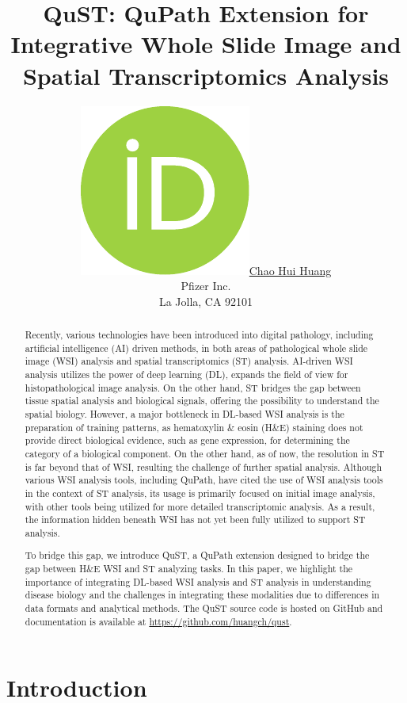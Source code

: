 \documentclass{article}
\title{QuST: QuPath Extension for Integrative Whole Slide Image and Spatial Transcriptomics Analysis}
\author{ \href{https://orcid.org/0000-0002-3837-8135}{\includegraphics[scale=0.06]{orcid.pdf}\hspace{1mm}Chao Hui Huang}\\
	Pfizer Inc.\\
	La Jolla, CA 92101 \\
}
\begin{document}
\maketitle

\begin{abstract}

Recently, various technologies have been introduced into digital pathology, including artificial intelligence (AI) driven methods, in both areas of pathological whole slide image (WSI) analysis and spatial transcriptomics (ST) analysis. AI-driven WSI analysis utilizes the power of deep learning (DL), expands the field of view for histopathological image analysis.  On the other hand, ST bridges the gap between tissue spatial analysis and biological signals, offering the possibility to understand the spatial biology. However, a major bottleneck in DL-based WSI analysis is the preparation of training patterns, as hematoxylin \& eosin (H\&E) staining does not provide direct biological evidence, such as gene expression, for determining the category of a biological component. On the other hand, as of now, the resolution in ST is far beyond that of WSI, resulting the challenge of further spatial analysis. Although various WSI analysis tools, including QuPath, have cited the use of WSI analysis tools in the context of ST analysis, its usage is primarily focused on initial image analysis, with other tools being utilized for more detailed transcriptomic analysis. As a result, the information hidden beneath WSI has not yet been fully utilized to support ST analysis.

To bridge this gap, we introduce QuST, a QuPath extension designed to bridge the gap between H\&E WSI and ST analyzing tasks. In this paper, we highlight the importance of integrating DL-based WSI analysis and ST analysis in understanding disease biology and the challenges in integrating these modalities due to differences in data formats and analytical methods. The QuST source code is hosted on GitHub and documentation is available at \url{https://github.com/huangch/qust}.

\end{abstract}


\section{Introduction}
\end{document}
